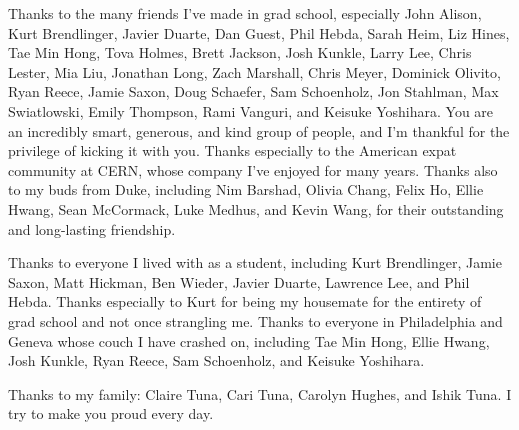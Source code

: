 Thanks to the many friends I've made in grad school, especially John Alison, Kurt Brendlinger, Javier Duarte, Dan Guest, Phil Hebda, Sarah Heim, Liz Hines, Tae Min Hong, Tova Holmes, Brett Jackson, Josh Kunkle, Larry Lee, Chris Lester, Mia Liu, Jonathan Long, Zach Marshall, Chris Meyer, Dominick Olivito, Ryan Reece, Jamie Saxon, Doug Schaefer, Sam Schoenholz, Jon Stahlman, Max Swiatlowski, Emily Thompson, Rami Vanguri, and Keisuke Yoshihara. You are an incredibly smart, generous, and kind group of people, and I'm thankful for the privilege of kicking it with you. Thanks especially to the American expat community at CERN, whose company I've enjoyed for many years. Thanks also to my buds from Duke, including Nim Barshad, Olivia Chang, Felix Ho, Ellie Hwang, Sean McCormack, Luke Medhus, and Kevin Wang, for their outstanding and long-lasting friendship.

Thanks to everyone I lived with as a student, including Kurt Brendlinger, Jamie Saxon, Matt Hickman, Ben Wieder, Javier Duarte, Lawrence Lee, and Phil Hebda. Thanks especially to Kurt for being my housemate for the entirety of grad school and not once strangling me. Thanks to everyone in Philadelphia and Geneva whose couch I have crashed on, including Tae Min Hong, Ellie Hwang, Josh Kunkle, Ryan Reece, Sam Schoenholz, and Keisuke Yoshihara.

Thanks to my family: Claire Tuna, Cari Tuna, Carolyn Hughes, and Ishik Tuna. I try to make you proud every day.

